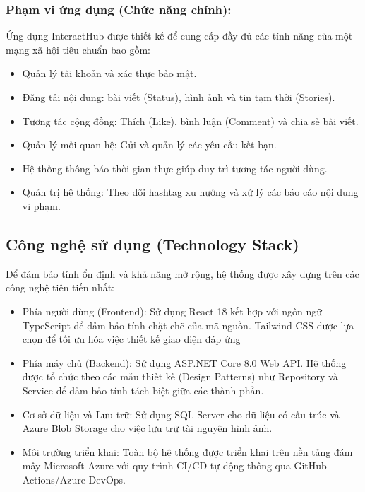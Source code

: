 \documentclass[a4paper]{article}
\begin{document}
        \subsubsection{Phạm vi ứng dụng (Chức năng chính):}
        Ứng dụng InteractHub được thiết kế để cung cấp đầy đủ các tính năng của một mạng xã hội tiêu chuẩn bao gồm:
            \begin{itemize}
                \item Quản lý tài khoản và xác thực bảo mật.
                \item Đăng tải nội dung: bài viết (Status), hình ảnh và tin tạm thời (Stories).
                \item Tương tác cộng đồng: Thích (Like), bình luận (Comment) và chia sẻ bài viết.
                \item Quản lý mối quan hệ: Gửi và quản lý các yêu cầu kết bạn.
                \item Hệ thống thông báo thời gian thực giúp duy trì tương tác người dùng.
                \item Quản trị hệ thống: Theo dõi hashtag xu hướng và xử lý các báo cáo nội dung vi phạm.
            \end{itemize}
        
    \subsection{Công nghệ sử dụng (Technology Stack)}
    Để đảm bảo tính ổn định và khả năng mở rộng, hệ thống được xây dựng trên các công nghệ tiên tiến nhất:
        \begin{itemize}
            \item Phía người dùng (Frontend): Sử dụng React 18 kết hợp với ngôn ngữ TypeScript để đảm bảo tính chặt chẽ của mã nguồn. Tailwind CSS được lựa chọn để tối ưu hóa việc thiết kế giao diện đáp ứng
            \item Phía máy chủ (Backend): Sử dụng ASP.NET Core 8.0 Web API. Hệ thống được tổ chức theo các mẫu thiết kế (Design Patterns) như Repository và Service để đảm bảo tính tách biệt giữa các thành phần.
            \item Cơ sở dữ liệu và Lưu trữ: Sử dụng SQL Server cho dữ liệu có cấu trúc và Azure Blob Storage cho việc lưu trữ tài nguyên hình ảnh.
            \item Môi trường triển khai: Toàn bộ hệ thống được triển khai trên nền tảng đám mây Microsoft Azure với quy trình CI/CD tự động thông qua GitHub Actions/Azure DevOps.
        \end{itemize}
\end{document}
